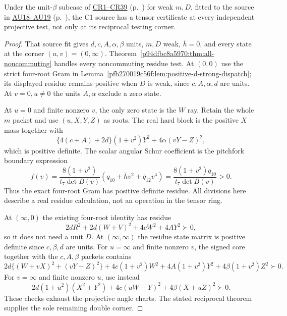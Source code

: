 \begin{corollary}
\label{pfb270019c56f:cor:c1-reciprocal-beta-all-tests}
Under the unit-$\beta$ subcase of \hyperref[component:p98f24864b071]{CR1--CR39} (p.~\pageref{component:p98f24864b071}) for weak $m,D$, fitted to the source in \hyperref[component:pc0b2849f8d09]{AU18--AU19} (p.~\pageref{component:pc0b2849f8d09}),
the C1 source has a tensor certificate at every independent projective
test, not only at its reciprocal testing corner.
\end{corollary}
\begin{proof}
That source fit gives $d,c,A,\alpha,\beta$ units, $m,D$ weak,
$\bar h=0$, and every state at the corner $(u,v)=(0,\infty)$.
Theorem~\ref{p94dfbc8a5970:thm:all-noncommuting} handles every noncommuting
residue test. At $(0,0)$ use the strict four-root Gram in
Lemma~\ref{pfb270019c56f:lem:positive-d-strong-dispatch}; its displayed residue
remains positive when $D$ is weak, since $c,A,\alpha,d$ are units.
At $v=0,u\ne0$ the units $A,\alpha$ exclude a zero state.

At $u=0$ and finite nonzero $v$, the only zero state is the $W$ ray.
Retain the whole $m$ packet and use $(u,X,Y,Z)$ as roots. The real
hard block is the positive $X$ mass together with
\[
 \{4(c+A)+2d\}(1+v^2)Y^2+4\alpha(vY-Z)^2,
\]
which is positive definite. The scalar angular Schur coefficient
is the pitchfork boundary expression
\[
 f(v)=\frac{8(1+v^2)}{t_7\det B(v)}
      (q_{10}+\bar h v^2+\bar q_{12}v^4)
      =\frac{8(1+v^2)q_{10}}{t_7\det B(v)}>0.
\]
Thus the exact four-root Gram has positive definite residue.
All divisions here describe a real residue calculation, not an
operation in the tensor ring.

At $(\infty,0)$ the existing four-root identity has residue
\[
 2dR^2+2d(W+V)^2+4cW^2+4AY^2\succ0,
\]
so it does not need a unit $D$. At $(\infty,\infty)$ the residue
state matrix is positive definite since $c,\beta,d$ are units.
For $u=\infty$ and finite nonzero $v$, the signed core together
with the $c,A,\beta$ packets contains
\[
 2d\{(W+vX)^2+(vY-Z)^2\}
 +4c(1+v^2)W^2+4A(1+v^2)Y^2
 +4\beta(1+v^2)Z^2\succ0.
\]
For $v=\infty$ and finite nonzero $u$, use instead
\[
 2d(1+u^2)(X^2+Y^2)+4c(uW-Y)^2
                              +4\beta(X+uZ)^2\succ0.
\]
These checks exhaust the projective angle charts. The stated
reciprocal theorem supplies the sole remaining double corner.
\end{proof}

